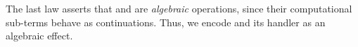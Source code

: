 The last law asserts that  and  are \emph{algebraic} operations, since their computational sub-terms behave as continuations.
Thus, we encode  and its handler as an algebraic effect.
%
\begin{code}[hide]%
%
\>[4]\AgdaSpace{}%
\AgdaModule{\AgdaUnderscore{}}\AgdaSpace{}%
\AgdaSpace{}%
\AgdaSpace{}%
\AgdaSymbol{:}\AgdaSpace{}%
\AgdaSpace{}%
\AgdaSpace{}%
\<%
\end{code}
\begin{code}[hide]%
\>[4][@{}l@{\AgdaIndent{1}}]%
\>[6]\AgdaSpace{}%
\AgdaSymbol{:}\AgdaSpace{}%
\AgdaSpace{}%
\AgdaSpace{}%
\AgdaOperator{\AgdaRecord{!}}\AgdaSpace{}%
\AgdaSymbol{(}\AgdaSpace{}%
\AgdaSpace{}%
\AgdaSpace{}%
\AgdaSpace{}%
\AgdaSpace{}%
\AgdaSpace{}%
\AgdaSpace{}%
\AgdaSpace{}%
\AgdaSpace{}%
\AgdaSpace{}%
\AgdaSymbol{))}\AgdaSpace{}%
\AgdaSpace{}%
\AgdaSpace{}%
\AgdaSpace{}%
\AgdaSpace{}%
\AgdaOperator{\AgdaRecord{!}}\AgdaSpace{}%
\AgdaSpace{}%
\<%
\\
%
\>[6]%
\>[11]\AgdaSpace{}%
\AgdaSpace{}%
\AgdaSymbol{\AgdaUnderscore{}}\AgdaSpace{}%
\AgdaSymbol{=}\AgdaSpace{}%
\AgdaSpace{}%
\<%
\\
%
\>[6]%
\>[11]\AgdaSpace{}%
\AgdaSymbol{(}%
\>[24]\AgdaOperator{\AgdaInductiveConstructor{,}}%
\>[29]\AgdaSymbol{)}\AgdaSpace{}%
\AgdaSpace{}%
\AgdaSymbol{=}\AgdaSpace{}%
\AgdaSpace{}%
\AgdaSpace{}%
\AgdaSymbol{=}\AgdaSpace{}%
\AgdaSpace{}%
\AgdaSpace{}%
\AgdaSpace{}%
\AgdaSpace{}%
\<%
\\
\>[6][@{}l@{\AgdaIndent{0}}]%
\>[8]\AgdaSpace{}%
\AgdaSpace{}%
\AgdaSymbol{(}\AgdaSpace{}%
\AgdaSymbol{)}\AgdaSpace{}%
\<%
\\
%
\>[6]%
\>[11]\AgdaSpace{}%
\AgdaSymbol{(}\AgdaSpace{}%
\AgdaSpace{}%
\AgdaSpace{}%
\AgdaOperator{\AgdaInductiveConstructor{,}}\AgdaSpace{}%
\AgdaSymbol{)}\AgdaSpace{}%
\AgdaSymbol{\AgdaUnderscore{}}\AgdaSpace{}%
\AgdaSymbol{=}\AgdaSpace{}%
\AgdaSpace{}%
\<%
\end{code}

